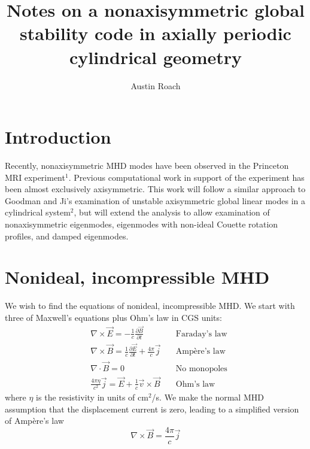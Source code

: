 \documentclass[letterpaper]{article}
\title{Notes on a nonaxisymmetric global stability code in axially periodic
cylindrical geometry}
\author{Austin Roach}
\begin{document}
\maketitle{}

\section{Introduction}

Recently, nonaxisymmetric MHD modes have been observed in the
Princeton MRI experiment$^1$.  Previous computational work in support
of the experiment has been almost exclusively axisymmetric.  This work
will follow a similar approach to Goodman and Ji's examination of
unstable axisymmetric global linear modes in a cylindrical system$^2$,
but will extend the analysis to allow examination of nonaxisymmetric
eigenmodes, eigenmodes with non-ideal Couette rotation profiles, and
damped eigenmodes.

\section{Nonideal, incompressible MHD}

We wish to find the equations of nonideal, incompressible MHD. We
start with three of Maxwell's equations plus Ohm's law in CGS units:
\begin{align}
&\nabla\times\vec{E} = -\frac{1}{c}\frac{\partial\vec{B}}{\partial t}
\quad&\text{Faraday's law}
\label{eqn:globalcode:faradayslaw}
\\
&\nabla\times\vec{B} = \frac{1}{c}\frac{\partial\vec{E}}{\partial t} 
                      + \frac{4\pi}{c}\vec{j}
\quad&\text{Amp\`{e}re's law}
\label{eqn:globalcode:ampereslaw}
\\
&\nabla\cdot\vec{B} = 0 \quad &\text{No monopoles}
\label{eqn:globalcode:nomonopoles}
\\
&\frac{4\pi\eta}{c^2}\vec{j} = \vec{E} + \frac{1}{c}\vec{v}\times\vec{B}
\quad&\text{Ohm's law}
\label{eqn:globalcode:ohmslaw}
\end{align}
where $\eta$ is the resistivity in units of cm$^2$/s. We make the
normal MHD assumption that the displacement current is zero, leading
to a simplified version of Amp\`{e}re's law
\begin{equation}
\nabla\times\vec{B} = \frac{4\pi}{c}\vec{j}
\label{eqn:globalcode:ampereslawmhd}
\end{equation}
\end{document}
